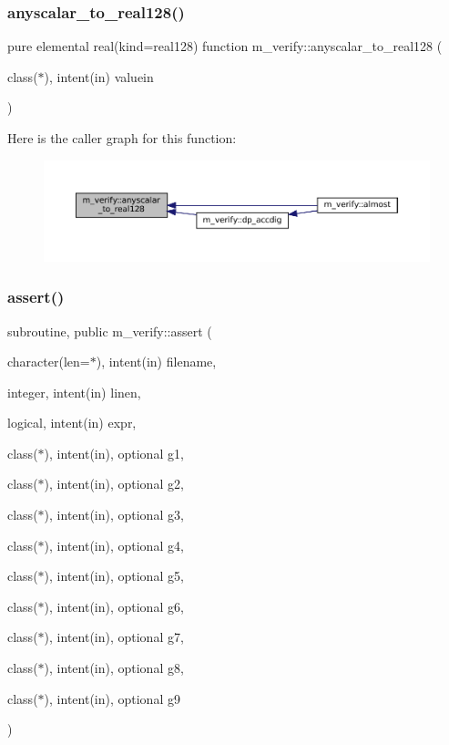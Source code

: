 \subsubsection{\texorpdfstring{anyscalar\+\_\+to\+\_\+real128()}{anyscalar\_to\_real128()}}
{\footnotesize\ttfamily pure elemental real(kind=real128) function m\+\_\+verify\+::anyscalar\+\_\+to\+\_\+real128 (\begin{DoxyParamCaption}\item[{class($\ast$), intent(in)}]{valuein }\end{DoxyParamCaption})\hspace{0.3cm}{\ttfamily [private]}}

Here is the caller graph for this function\+:\nopagebreak
\begin{figure}[H]
\begin{center}
\leavevmode
\includegraphics[width=350pt]{namespacem__verify_ab08d7bdca3b5d5e99732919be5880dc4_icgraph}
\end{center}
\end{figure}
\mbox{\label{namespacem__verify_a83a6bafddb101d8b0fe70f34827836ff}} 
\subsubsection{\texorpdfstring{assert()}{assert()}}
{\footnotesize\ttfamily subroutine, public m\+\_\+verify\+::assert (\begin{DoxyParamCaption}\item[{character(len=$\ast$), intent(in)}]{filename,  }\item[{integer, intent(in)}]{linen,  }\item[{logical, intent(in)}]{expr,  }\item[{class($\ast$), intent(in), optional}]{g1,  }\item[{class($\ast$), intent(in), optional}]{g2,  }\item[{class($\ast$), intent(in), optional}]{g3,  }\item[{class($\ast$), intent(in), optional}]{g4,  }\item[{class($\ast$), intent(in), optional}]{g5,  }\item[{class($\ast$), intent(in), optional}]{g6,  }\item[{class($\ast$), intent(in), optional}]{g7,  }\item[{class($\ast$), intent(in), optional}]{g8,  }\item[{class($\ast$), intent(in), optional}]{g9 }\end{DoxyParamCaption})}



